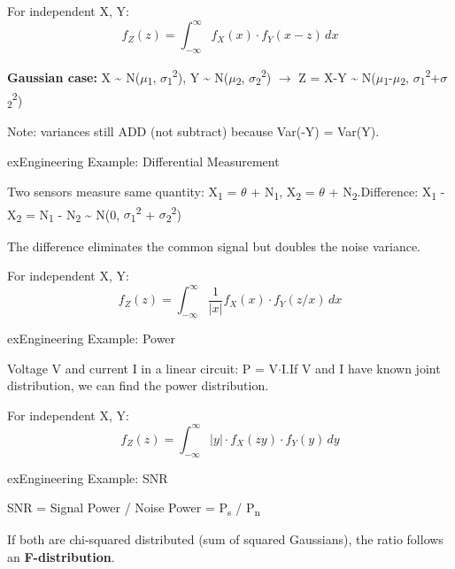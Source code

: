 
For independent X, Y:\PSbr{}\[f_Z(z) = \int_{-\infty}^{\infty} f_X(x) \cdot f_Y(x-z) \, dx\]

\textbf{Gaussian case:} X \textasciitilde{} N(\ensuremath{\mu}\textsubscript{1}, \ensuremath{\sigma}\textsubscript{1}\textsuperscript{2}), Y \textasciitilde{} N(\ensuremath{\mu}\textsubscript{2}, \ensuremath{\sigma}\textsubscript{2}\textsuperscript{2}) \ensuremath{\to} Z = X-Y \textasciitilde{} N(\ensuremath{\mu}\textsubscript{1}-\ensuremath{\mu}\textsubscript{2}, \ensuremath{\sigma}\textsubscript{1}\textsuperscript{2}+\ensuremath{\sigma}\textsubscript{2}\textsuperscript{2})

Note: variances still ADD (not subtract) because Var(-Y) = Var(Y).

\begin{PSbox}[unbreakable]{ex}{Engineering Example: Differential Measurement}

Two sensors measure same quantity: X\textsubscript{1} = \ensuremath{\theta} + N\textsubscript{1}, X\textsubscript{2} = \ensuremath{\theta} + N\textsubscript{2}.\PSbr{}Difference: X\textsubscript{1} - X\textsubscript{2} = N\textsubscript{1} - N\textsubscript{2} \textasciitilde{} N(0, \ensuremath{\sigma}\textsubscript{1}\textsuperscript{2} + \ensuremath{\sigma}\textsubscript{2}\textsuperscript{2})

The difference eliminates the common signal but doubles the noise variance.

\end{PSbox}


For independent X, Y:\PSbr{}\[f_Z(z) = \int_{-\infty}^{\infty} \frac{1}{|x|} f_X(x) \cdot f_Y(z/x) \, dx\]

\begin{PSbox}[unbreakable]{ex}{Engineering Example: Power}

Voltage V and current I in a linear circuit: P = V\ensuremath{\cdot}I.\PSbr{}If V and I have known joint distribution, we can find the power distribution.

\end{PSbox}


For independent X, Y:\PSbr{}\[f_Z(z) = \int_{-\infty}^{\infty} |y| \cdot f_X(zy) \cdot f_Y(y) \, dy\]

\begin{PSbox}[unbreakable]{ex}{Engineering Example: SNR}

SNR = Signal Power / Noise Power = P\textsubscript{s} / P\textsubscript{n}

If both are chi-squared distributed (sum of squared Gaussians), the ratio follows an \textbf{F-distribution}.

\end{PSbox}

